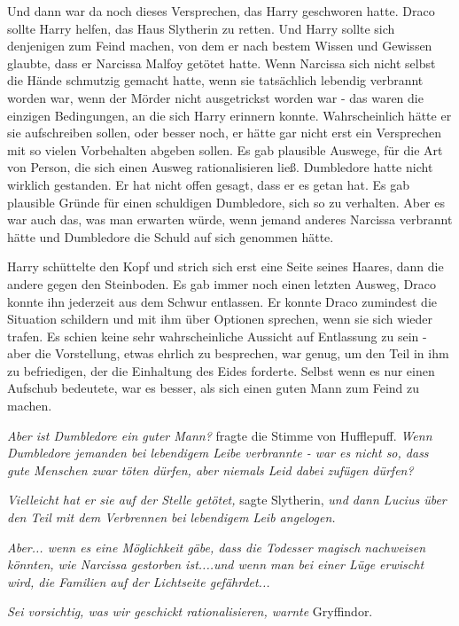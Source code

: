 Und dann war da noch dieses Versprechen, das Harry geschworen hatte. Draco
sollte Harry helfen, das Haus Slytherin zu retten. Und Harry sollte sich
denjenigen zum Feind machen, von dem er nach bestem Wissen und Gewissen glaubte,
dass er Narcissa Malfoy getötet hatte. Wenn Narcissa sich nicht selbst die Hände
schmutzig gemacht hatte, wenn sie tatsächlich lebendig verbrannt worden war,
wenn der Mörder nicht ausgetrickst worden war - das waren die einzigen
Bedingungen, an die sich Harry erinnern konnte. Wahrscheinlich hätte er sie
aufschreiben sollen, oder besser noch, er hätte gar nicht erst ein Versprechen
mit so vielen Vorbehalten abgeben sollen. Es gab plausible Auswege, für die Art
von Person, die sich einen Ausweg rationalisieren ließ. Dumbledore hatte nicht
wirklich gestanden. Er hat nicht offen gesagt, dass er es getan hat. Es gab
plausible Gründe für einen schuldigen Dumbledore, sich so zu verhalten. Aber es
war auch das, was man erwarten würde, wenn jemand anderes Narcissa verbrannt
hätte und Dumbledore die Schuld auf sich genommen hätte.

Harry schüttelte den Kopf und strich sich erst eine Seite seines Haares, dann
die andere gegen den Steinboden. Es gab immer noch einen letzten Ausweg, Draco
konnte ihn jederzeit aus dem Schwur entlassen. Er konnte Draco zumindest die
Situation schildern und mit ihm über Optionen sprechen, wenn sie sich wieder
trafen. Es schien keine sehr wahrscheinliche Aussicht auf Entlassung zu sein -
aber die Vorstellung, etwas ehrlich zu besprechen, war genug, um den Teil in ihm
zu befriedigen, der die Einhaltung des Eides forderte. Selbst wenn es nur einen
Aufschub bedeutete, war es besser, als sich einen guten Mann zum Feind zu
machen.

\emph{Aber ist Dumbledore ein guter Mann?} fragte die Stimme von Hufflepuff.
\emph{Wenn Dumbledore jemanden bei lebendigem Leibe verbrannte - war es nicht
so, dass gute Menschen zwar töten dürfen, aber niemals Leid dabei zufügen
dürfen?}

\emph{Vielleicht hat er sie auf der Stelle getötet,} sagte Slytherin, \emph{und
dann Lucius über den Teil mit dem Verbrennen bei lebendigem Leib angelogen.}

\emph{Aber... wenn es eine Möglichkeit gäbe, dass die Todesser magisch
nachweisen könnten, wie Narcissa gestorben ist....und wenn man bei einer Lüge
erwischt wird, die Familien auf der Lichtseite gefährdet...}

\emph{Sei vorsichtig, was wir geschickt rationalisieren, warnte} Gryffindor.

